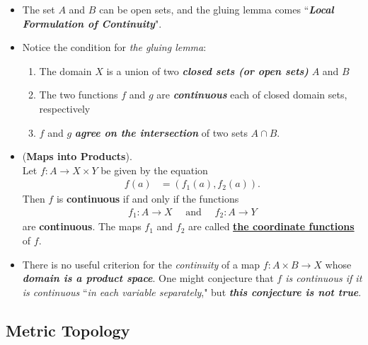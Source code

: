 \documentclass[11pt]{article}
\begin{document}
\begin{itemize}
\item \begin{remark}
The set $A$ and $B$ can be open sets, and the gluing lemma comes ``\emph{\textbf{Local Formulation of Continuity}}".
\end{remark}

\item \begin{remark}
Notice the condition for \emph{the gluing lemma}:
\begin{enumerate}
\item The domain $X$ is a union of two \emph{\textbf{closed sets (or open sets)}} $A$ and $B$
\item The two functions $f$ and $g$ are \emph{\textbf{continuous}} each of closed domain sets, respectively
\item $f$ and $g$ \emph{\textbf{agree on the intersection}} of two sets $A \cap B$.
\end{enumerate}
\end{remark}

\item \begin{theorem} (\textbf{Maps into Products}). \citep{munkres2000topology}\\
Let $f : A \rightarrow X \times Y$ be given by the equation
\begin{align*}
f(a)  &= (f_1(a), f_2(a)).
\end{align*} Then $f$ is \textbf{continuous} if and only if the functions
\begin{align*}
f_1: A \rightarrow X\quad \text{ and }\quad f_2: A \rightarrow Y
\end{align*} 
are \textbf{continuous}. The maps $f_1$ and $f_2$ are called \underline{\textbf{the coordinate functions}} of $f$.
\end{theorem}

\item \begin{remark}
There is no useful criterion for the \emph{continuity} of a map $f : A \times B \rightarrow X$ whose \emph{\textbf{domain is a product space}}. One might conjecture that \emph{$f$ is continuous if it is continuous }``\emph{in each variable separately}," but \emph{\textbf{this conjecture is not true}}.
\end{remark}
\end{itemize}


\subsection{Metric Topology}
\end{document}
